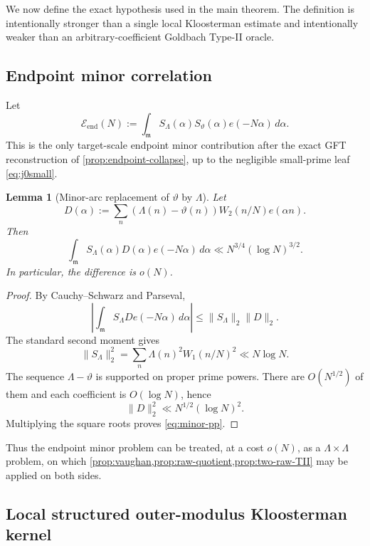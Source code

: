 \documentclass[11pt]{article}
\newtheorem{lemma}[theorem]{Lemma}
\theoremstyle{definition}
\theoremstyle{remark}
\newcommand{\1}{\mathbf 1}
\newcommand{\mcal}{\mathfrak m}
\newcommand{\Eend}{\mathcal E_{\mathrm{end}}}
\begin{document}
We now define the exact hypothesis used in the main theorem.  The definition is intentionally stronger than a single local Kloosterman estimate and intentionally weaker than an arbitrary-coefficient Goldbach Type-II oracle.

\subsection{Endpoint minor correlation}

Let
\begin{equation}\label{eq:Eend}
 \Eend(N)
 :=\int_{\mcal}S_\Lambda(\alpha)S_\vartheta(\alpha)e(-N\alpha)\,d\alpha.
\end{equation}
This is the only target-scale endpoint minor contribution after the exact GFT reconstruction of \cref{prop:endpoint-collapse}, up to the negligible small-prime leaf \eqref{eq:j0small}.

\begin{lemma}[Minor-arc replacement of \(\vartheta\) by \(\Lambda\)]\label{lem:minor-pp}
Let
\[
 D(\alpha):=\sum_n(\Lambda(n)-\vartheta(n))W_2(n/N)e(\alpha n).
\]
Then
\begin{equation}\label{eq:minor-pp}
 \int_{\mcal}S_\Lambda(\alpha)D(\alpha)e(-N\alpha)\,d\alpha
 \ll N^{3/4}(\log N)^{3/2}.
\end{equation}
In particular, the difference is \(o(N)\).
\end{lemma}

\begin{proof}
By Cauchy--Schwarz and Parseval,
\[
 \left|\int_{\mcal}S_\Lambda D e(-N\alpha)\,d\alpha\right|
 \le \|S_\Lambda\|_2\|D\|_2.
\]
The standard second moment gives
\[
 \|S_\Lambda\|_2^2
 =\sum_n\Lambda(n)^2W_1(n/N)^2
 \ll N\log N.
\]
The sequence \(\Lambda-\vartheta\) is supported on proper prime powers.  There are \(O(N^{1/2})\) of them and each coefficient is \(O(\log N)\), hence
\[
 \|D\|_2^2\ll N^{1/2}(\log N)^2.
\]
Multiplying the square roots proves \eqref{eq:minor-pp}.
\end{proof}

Thus the endpoint minor problem can be treated, at a cost \(o(N)\), as a \(\Lambda\times\Lambda\) problem, on which \cref{prop:vaughan,prop:raw-quotient,prop:two-raw-TII} may be applied on both sides.

\subsection{Local structured outer-modulus Kloosterman kernel}
\end{document}
